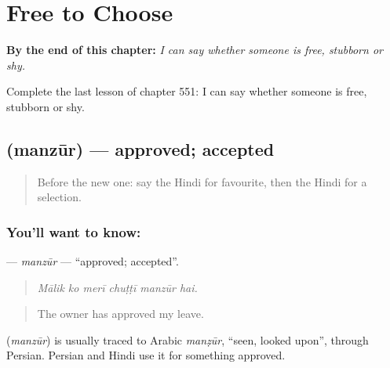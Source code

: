 
\chapter{Free to Choose}
\label{ch:hi-free-to-choose}

\begin{chapteropening}
\textbf{By the end of this chapter:} \emph{I can say whether someone is free, stubborn or shy.}

Complete the last lesson of chapter 551: I can say whether someone is free, stubborn or shy.
\end{chapteropening}

\section[\texorpdfstring{\hi{मंज़ूर} (manzūr)}{मंज़ूर (manzūr)}]{ (manzūr) — approved; accepted}

\label{lesson:HI-C551-manzur}



\begin{quote}
Before the new one: say the Hindi for favourite, then the Hindi for a selection.
\end{quote}

\subsection*{You'll want to know: }
\textbf{} — \emph{manzūr} — \textquotedblleft{}approved; accepted\textquotedblright{}.

\begin{quote}
     
\end{quote}

\begin{quote}
\emph{Mālik ko merī chuṭṭī manzūr hai.}
\end{quote}

\begin{quote}
The owner has approved my leave.
\end{quote}

\begin{cousinweb}
\textbf{} (\emph{manzūr}) is usually traced to Arabic \emph{manẓūr}, \textquotedblleft{}seen, looked upon\textquotedblright{}, through Persian. Persian and Hindi use it for something approved.
\end{cousinweb}

